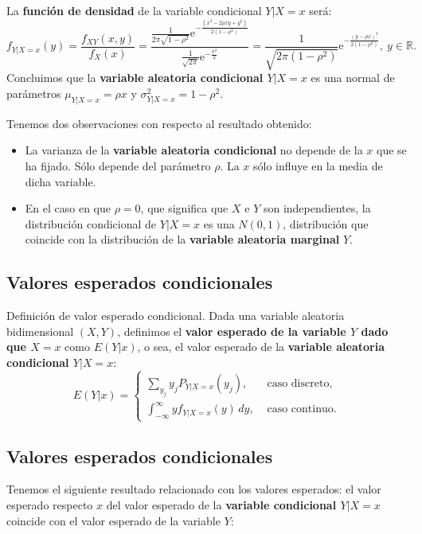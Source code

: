 \documentclass[]{book}
\begin{document}
La \textbf{función de densidad} de la variable condicional \(Y|X=x\) será:
\[
f_{Y|X=x}(y)=\frac{f_{XY}(x,y)}{f_X(x)}=\frac{\frac{1}{2\pi\sqrt{1-\rho^2}}\mathrm{e}^{-\frac{(x^2-2\rho xy+y^2)}{2(1-\rho^2)}}}{\frac{1}{\sqrt{2\pi}}\mathrm{e}^{-\frac{x^2}{2}}}=\frac{1}{\sqrt{2\pi (1-\rho^2)}}\mathrm{e}^{-\frac{(y-\rho x)^2}{2(1-\rho^2)}},\ y\in\mathbb{R}.
\]
Concluimos que la \textbf{variable aleatoria condicional \(Y|X=x\)} es una normal de parámetros \(\mu_{Y|X=x}=\rho x\) y \(\sigma_{Y|X=x}^2 =1-\rho^2\).

Tenemos dos observaciones con respecto al resultado obtenido:

\begin{itemize}
\item
  La varianza de la \textbf{variable aleatoria condicional} no depende de la \(x\) que se ha fijado. Sólo depende del parámetro \(\rho\). La \(x\) sólo influye en la media de dicha variable.
\item
  En el caso en que \(\rho=0\), que significa que \(X\) e \(Y\) son independientes, la distribución condicional de \(Y|X=x\) es una \(N(0,1)\), distribución que coincide con la distribución de la \textbf{variable aleatoria marginal} \(Y\).
\end{itemize}

\hypertarget{valores-esperados-condicionales}{%
\subsection{Valores esperados condicionales}\label{valores-esperados-condicionales}}

Definición de valor esperado condicional.
Dada una variable aleatoria bidimensional \((X,Y)\), definimos el \textbf{valor esperado de la variable \(Y\) dado que \(X=x\)} como \(E(Y|x)\), o sea, el valor esperado de la \textbf{variable aleatoria condicional \(Y|X=x\)}:
\[
E(Y|x)=\begin{cases}
\sum_{y_j} y_j P_{Y|X=x}(y_j), & \mbox{ caso discreto,}\\
\int_{-\infty}^\infty y f_{Y|X=x}(y)\,dy, & \mbox{ caso continuo.}
\end{cases}
\]

\hypertarget{valores-esperados-condicionales-1}{%
\subsection{Valores esperados condicionales}\label{valores-esperados-condicionales-1}}

Tenemos el siguiente resultado relacionado con los valores esperados: el valor esperado respecto \(x\) del valor esperado de la \textbf{variable condicional \(Y|X=x\)} coincide con el valor esperado de la variable \(Y\):
\end{document}
